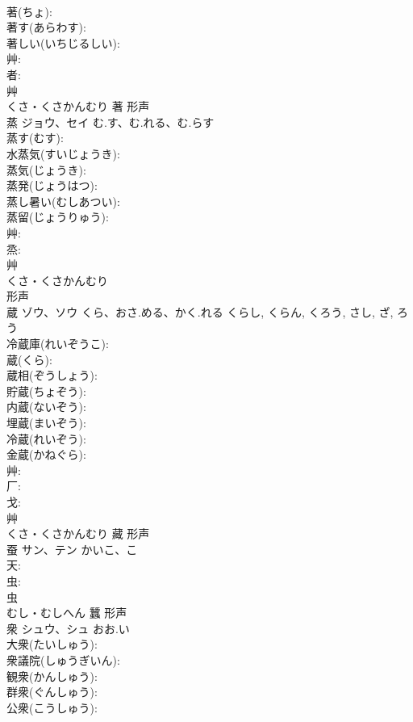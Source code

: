 \documentclass[8pt]{extreport}
\begin{document}
\begin{CJK}{UTF8}{min}
\\	著(ちょ): 
\\	著す(あらわす): 
\\	著しい(いちじるしい): 
\\	艸: 
\\	者: 
\\	艸	
\\	くさ・くさかんむり	著	形声 
\\	蒸	ジョウ、セイ	む.す、む.れる、む.らす		
\\	蒸す(むす): 
\\	水蒸気(すいじょうき): 
\\	蒸気(じょうき): 
\\	蒸発(じょうはつ): 
\\	蒸し暑い(むしあつい): 
\\	蒸留(じょうりゅう): 
\\	艸: 
\\	烝: 
\\	艸	
\\	くさ・くさかんむり	
\\	形声 
\\	蔵	ゾウ、ソウ	くら、おさ.める、かく.れる	くらし, くらん, くろう, さし, ざ, ろう	
\\	冷蔵庫(れいぞうこ): 
\\	蔵(くら): 
\\	蔵相(ぞうしょう): 
\\	貯蔵(ちょぞう): 
\\	内蔵(ないぞう): 
\\	埋蔵(まいぞう): 
\\	冷蔵(れいぞう): 
\\	金蔵(かねぐら): 
\\	艸: 
\\	厂: 
\\	戈: 
\\	艸	
\\	くさ・くさかんむり	藏	形声 
\\	蚕	サン、テン	かいこ、こ		
\\	天: 
\\	虫: 
\\	虫	
\\	むし・むしへん	蠶	形声 
\\	衆	シュウ、シュ	おお.い		
\\	大衆(たいしゅう): 
\\	衆議院(しゅうぎいん): 
\\	観衆(かんしゅう): 
\\	群衆(ぐんしゅう): 
\\	公衆(こうしゅう): 

\end{CJK}
\end{document}
